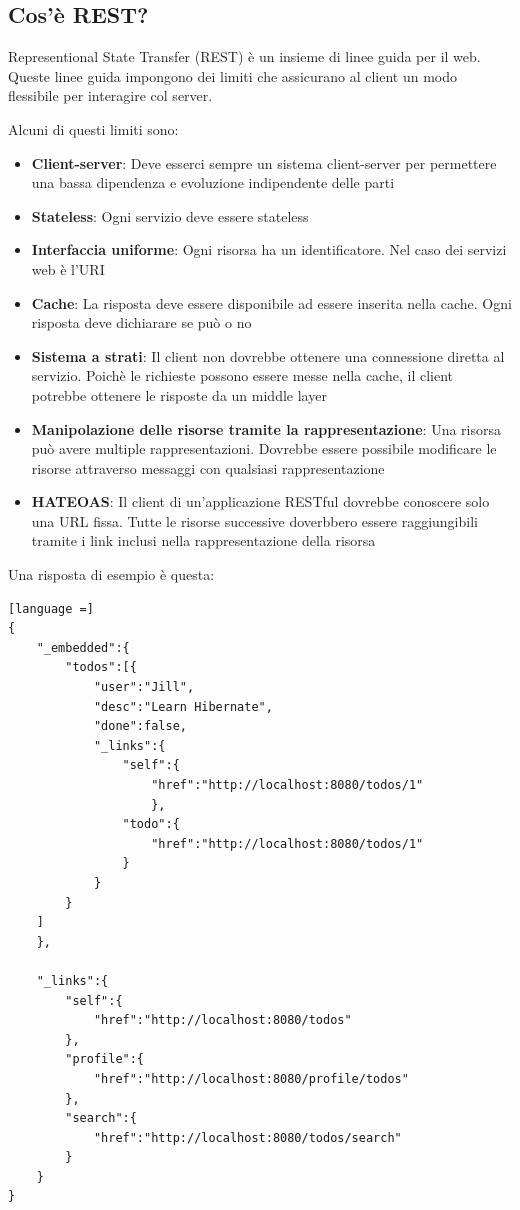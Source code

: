\documentclass[11pt,a4paper]{book}
\begin{document}
\subsection{Cos'è REST?}
Representional State Transfer (REST) è un insieme di linee guida per il web. Queste linee guida impongono dei limiti che assicurano al client un modo flessibile per interagire col server.

Alcuni di questi limiti sono:
\begin{itemize}
	\item \textbf{Client-server}: Deve esserci sempre un sistema client-server per permettere una bassa dipendenza e evoluzione indipendente delle parti
	\item \textbf{Stateless}: Ogni servizio deve essere stateless
	\item \textbf{Interfaccia uniforme}: Ogni risorsa ha un identificatore. Nel caso dei servizi web è l'URI
	\item \textbf{Cache}: La risposta deve essere disponibile ad essere inserita nella cache. Ogni risposta deve dichiarare se può o no
	\item \textbf{Sistema a strati}: Il client non dovrebbe ottenere una connessione diretta al servizio. Poichè le richieste possono essere messe nella cache, il client potrebbe ottenere le risposte da un middle layer
	\item \textbf{Manipolazione delle risorse tramite la rappresentazione}: Una risorsa può avere multiple rappresentazioni. Dovrebbe essere possibile modificare le risorse attraverso messaggi con qualsiasi rappresentazione
	\item \textbf{HATEOAS}: Il client di un'applicazione RESTful dovrebbe conoscere solo una URL fissa. Tutte le risorse successive doverbbero essere raggiungibili tramite i link inclusi nella rappresentazione della risorsa  
\end{itemize}

Una risposta di esempio è questa:
\begin{lstlisting}[language =]
{
	"_embedded":{
		"todos":[{
			"user":"Jill",
			"desc":"Learn Hibernate",
			"done":false,
			"_links":{
				"self":{
					"href":"http://localhost:8080/todos/1"
					},
				"todo":{
					"href":"http://localhost:8080/todos/1"
				}
			}
		}
	]
	},

	"_links":{
		"self":{
			"href":"http://localhost:8080/todos"
		},
		"profile":{
			"href":"http://localhost:8080/profile/todos"
		},
		"search":{
			"href":"http://localhost:8080/todos/search"
		}	
	}
}
\end{lstlisting}
\end{document}
